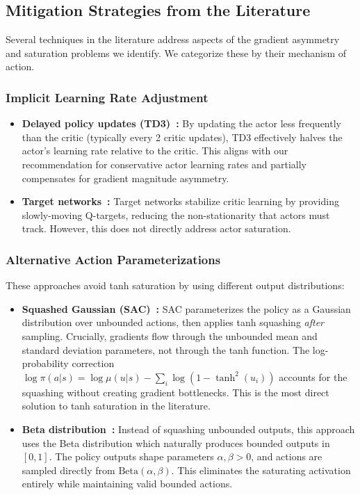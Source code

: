 \subsection{Mitigation Strategies from the Literature}

Several techniques in the literature address aspects of the gradient asymmetry and saturation problems we identify. We categorize these by their mechanism of action.

\subsubsection{Implicit Learning Rate Adjustment}

\begin{itemize}
    \item \textbf{Delayed policy updates (TD3)~\cite{fujimoto2018addressing}:} By updating the actor less frequently than the critic (typically every 2 critic updates), TD3 effectively halves the actor's learning rate relative to the critic. This aligns with our recommendation for conservative actor learning rates and partially compensates for gradient magnitude asymmetry.

    \item \textbf{Target networks~\cite{lillicrap2015continuous}:} Target networks stabilize critic learning by providing slowly-moving Q-targets, reducing the non-stationarity that actors must track. However, this does not directly address actor saturation.
\end{itemize}

\subsubsection{Alternative Action Parameterizations}

These approaches avoid tanh saturation by using different output distributions:

\begin{itemize}
    \item \textbf{Squashed Gaussian (SAC)~\cite{haarnoja2018soft}:} SAC parameterizes the policy as a Gaussian distribution over unbounded actions, then applies tanh squashing \textit{after} sampling. Crucially, gradients flow through the unbounded mean and standard deviation parameters, not through the tanh function. The log-probability correction $\log \pi(a|s) = \log \mu(u|s) - \sum_i \log(1 - \tanh^2(u_i))$ accounts for the squashing without creating gradient bottlenecks. This is the most direct solution to tanh saturation in the literature.

    \item \textbf{Beta distribution~\cite{chou2017improving}:} Instead of squashing unbounded outputs, this approach uses the Beta distribution which naturally produces bounded outputs in $[0, 1]$. The policy outputs shape parameters $\alpha, \beta > 0$, and actions are sampled directly from $\text{Beta}(\alpha, \beta)$. This eliminates the saturating activation entirely while maintaining valid bounded actions.
\end{itemize}

